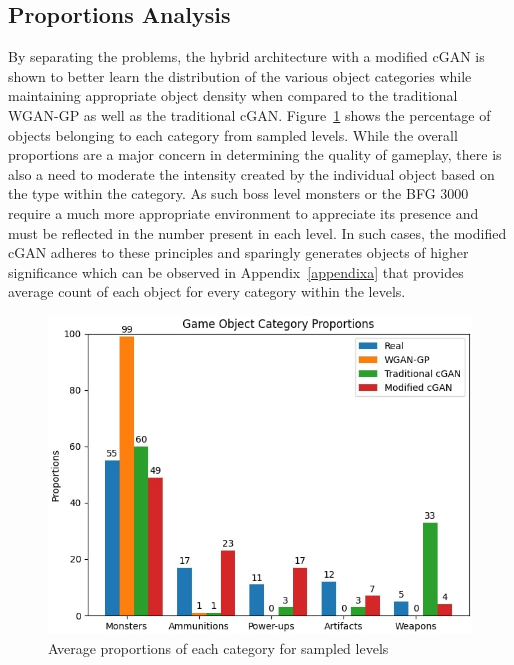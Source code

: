\documentclass{Configuration_Files/PoliMi3i_thesis}
\begin{document}
\subsection{Proportions Analysis}
By separating the problems, the hybrid architecture with a modified cGAN is shown
to better learn the distribution of the various object categories while maintaining 
appropriate object density when compared to the traditional WGAN-GP as well as the 
traditional cGAN. Figure~\ref{fig:categoyproportions} shows the percentage of objects 
belonging to each category from sampled levels. While the overall proportions are 
a major concern in determining the quality of gameplay, there is also a need to 
moderate the intensity created by the individual object based on the type within the 
category. As such boss level monsters or the BFG 3000 require a much more 
appropriate environment to appreciate its presence and must be reflected in the 
number present in each level. In such cases, the modified cGAN adheres to these 
principles and sparingly generates objects of higher significance which can be observed 
in Appendix~\ref{appendixa} that provides average count of each object for every 
category within the levels.
\begin{figure}[H]
    \centering
    \includegraphics[width=1\textwidth]{cate_props.jpg}
    \caption{Average proportions of each category for sampled levels}
    \label{fig:categoyproportions}
\end{figure}
\newpage
\end{document}
